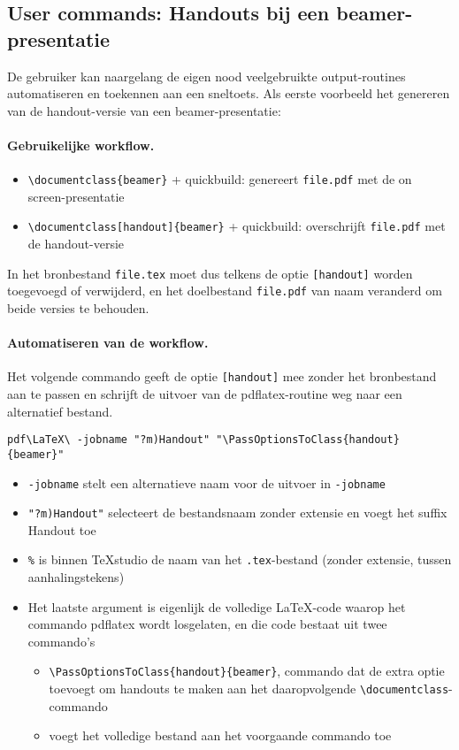 \documentclass[kulak]{kulakarticle} %
\begin{document}
\subsection{User commands: Handouts bij een beamer-presentatie}
De gebruiker kan naargelang de eigen nood veelgebruikte output-routines automatiseren en toekennen aan een sneltoets. Als eerste voorbeeld het genereren van de handout-versie van een beamer-presentatie:
\paragraph{Gebruikelijke workflow.}
\begin{itemize}
\item \verb+\documentclass{beamer}+ + quickbuild: genereert \texttt{file.pdf} met de on screen-presentatie
\item \verb+\documentclass[handout]{beamer}+ + quickbuild: overschrijft \texttt{file.pdf} met de handout-versie
\end{itemize}
In het bronbestand \texttt{file.tex} moet dus telkens de optie \texttt{[handout]} worden toegevoegd of verwijderd, en het doelbestand \texttt{file.pdf} van naam veranderd om beide versies te behouden.
\paragraph{Automatiseren van de workflow.}

Het volgende commando geeft de optie \texttt{[handout]} mee zonder het bronbestand aan te passen en schrijft de uitvoer van de pdflatex-routine weg naar een alternatief bestand.
\begin{verbatim}
pdf\LaTeX\ -jobname "?m)Handout" "\PassOptionsToClass{handout}{beamer}"
\end{verbatim}

\begin{itemize}
\item \verb+-jobname+ stelt een alternatieve naam voor de uitvoer in
\texttt{-jobname}
\item \verb+"?m)Handout"+ selecteert de bestandsnaam zonder extensie en voegt het suffix Handout toe
\item \verb+%+ is binnen TeXstudio de naam van het \texttt{.tex}-bestand (zonder extensie, tussen aanhalingstekens)
\item Het laatste argument is eigenlijk de volledige \LaTeX-code waarop het commando pdflatex wordt losgelaten, en die code bestaat uit twee commando's
\begin{itemize}
\item \verb+\PassOptionsToClass{handout}{beamer}+, commando dat de extra optie toevoegt om handouts te maken aan het daaropvolgende \verb+\documentclass+-commando
\item \verb++ voegt het volledige bestand aan het voorgaande commando toe
\end{itemize}
\end{itemize}
\end{document}
